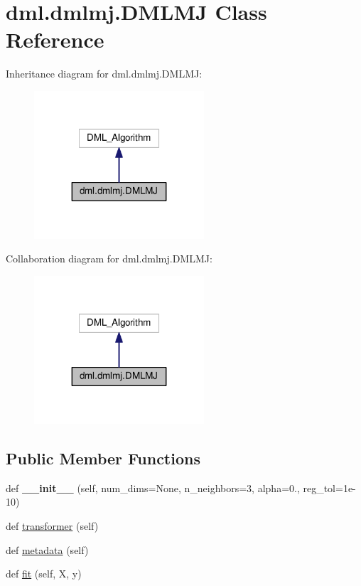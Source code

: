 \hypertarget{classdml_1_1dmlmj_1_1DMLMJ}{}\section{dml.\+dmlmj.\+D\+M\+L\+MJ Class Reference}
\label{classdml_1_1dmlmj_1_1DMLMJ}


Inheritance diagram for dml.\+dmlmj.\+D\+M\+L\+MJ\+:
\nopagebreak
\begin{figure}[H]
\begin{center}
\leavevmode
\includegraphics[width=179pt]{classdml_1_1dmlmj_1_1DMLMJ__inherit__graph}
\end{center}
\end{figure}


Collaboration diagram for dml.\+dmlmj.\+D\+M\+L\+MJ\+:
\nopagebreak
\begin{figure}[H]
\begin{center}
\leavevmode
\includegraphics[width=179pt]{classdml_1_1dmlmj_1_1DMLMJ__coll__graph}
\end{center}
\end{figure}
\subsection*{Public Member Functions}
\begin{DoxyCompactItemize}
\item 
def {\bfseries \+\_\+\+\_\+init\+\_\+\+\_\+} (self, num\+\_\+dims=None, n\+\_\+neighbors=3, alpha=0., reg\+\_\+tol=1e-\/10)\hypertarget{classdml_1_1dmlmj_1_1DMLMJ_a5bc22f7adee1aff574db36f7a4c3cc08}{}\label{classdml_1_1dmlmj_1_1DMLMJ_a5bc22f7adee1aff574db36f7a4c3cc08}

\item 
def \hyperlink{classdml_1_1dmlmj_1_1DMLMJ_a025017cae3f8607f6a28c116f1505b4e}{transformer} (self)
\item 
def \hyperlink{classdml_1_1dmlmj_1_1DMLMJ_a9747589a8736d994b0e2af00ea92d3eb}{metadata} (self)
\item 
def \hyperlink{classdml_1_1dmlmj_1_1DMLMJ_ada35e252dc232294ad3ef830f5f5fc1e}{fit} (self, X, y)
\end{DoxyCompactItemize}
